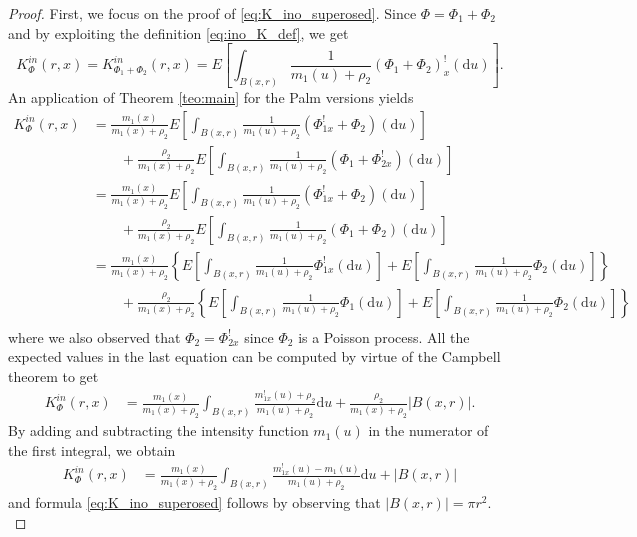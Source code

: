\documentclass[11pt,a4paper,oneside]{article}
\newcommand{\dd}{\mathrm d}
\newcommand{\E}{E}
\theoremstyle{definition}
\theoremstyle{remark}
\begin{document}
\begin{proof} 
First, we focus on the proof of \eqref{eq:K_ino_superosed}.
    Since $\Phi=\Phi_1 + \Phi_2$ and by exploiting the definition \eqref{eq:ino_K_def}, we get
    \begin{equation*}
        K_{\Phi}^{in} (r,x)  =  K_{\Phi_1+\Phi_2}^{in} (r,x) = \E \left[ \int_{B (x, r) } \frac{1}{m_{1} (u)+ \rho_2 } (\Phi_1+\Phi_2)^{!}_x (\dd u)\right].
    \end{equation*}
    An application of Theorem \ref{teo:main} for the Palm versions yields
    \begin{align*}
        K_{\Phi}^{in} (r,x) & = \frac{m_{1} (x) }{m_{1} (x)+ \rho_2}\E \left[ \int_{B (x, r) } \frac{1}{m_{1} (u)+ \rho_2 } (\Phi_{1x}^{!} + \Phi_2) (\dd u)\right]\\
        & \qquad+
        \frac{\rho_2 }{m_{1} (x)+ \rho_2}\E \left[ \int_{B (x, r) } \frac{1}{m_{1} (u)+ \rho_2 } (\Phi_1 + \Phi_{2x}^{!}) (\dd u)\right]\\
        & = \frac{m_{1} (x) }{m_{1} (x)+ \rho_2}\E \left[ \int_{B (x, r) } \frac{1}{m_{1} (u)+ \rho_2 } (\Phi_{1x}^{!} + \Phi_2) (\dd u)\right]\\
        & \qquad+
        \frac{\rho_2 }{m_{1} (x)+ \rho_2}\E \left[ \int_{B (x, r) } \frac{1}{m_{1} (u)+ \rho_2 } (\Phi_1 + \Phi_{2}) (\dd u)\right]\\
        & = \frac{m_{1} (x) }{m_{1} (x)+ \rho_2} \left\{ \E \left[ \int_{B (x, r) } \frac{1}{m_{1} (u)+ \rho_2 } \Phi_{1x}^{!}  (\dd u)\right] + \E \left[ \int_{B (x, r) } \frac{1}{m_{1} (u)+ \rho_2 } \Phi_2 (\dd u)\right] \right\}\\
        & \qquad+
        \frac{\rho_2 }{m_{1} (x)+ \rho_2}\left\{ \E \left[ \int_{B (x, r) } \frac{1}{m_{1} (u)+ \rho_2 } \Phi_1 (\dd u)\right] + \E \left[ \int_{B (x, r) } \frac{1}{m_{1} (u)+ \rho_2 } \Phi_{2} (\dd u)\right]  \right\} \\
    \end{align*}
    where we also observed that $\Phi_2 = \Phi_{2x}^!$ since $\Phi_2$ is a Poisson process. All the expected values in the last equation can be computed by virtue of the Campbell theorem to get
      \begin{align*}
        K_{\Phi}^{in} (r,x) & =\frac{m_{1} (x) }{m_{1} (x)+ \rho_2} \int_{B(x, r)} \frac{m_{1x}^! (u)+ \rho_2 }{m_{1}(u)+ \rho_2} \dd u  +
        \frac{\rho_2}{m_1 (x) + \rho_2} |B (x, r)|.
        \end{align*}
    By adding and subtracting the intensity function $m_1 (u)$ in the numerator of the first integral, we obtain
    \begin{align*}
        K_{\Phi}^{in} (r,x) & =\frac{m_{1} (x) }{m_{1} (x)+ \rho_2} \int_{B(x, r)} \frac{m_{1x}^! (u) - m_1 (u) }{m_{1}(u)+ \rho_2} \dd u  + |B (x, r)|
        \end{align*}
        and formula \eqref{eq:K_ino_superosed} follows by observing that $|B (x, r)| = \pi r^2$.\\


\end{proof}
\end{document}
